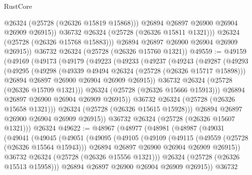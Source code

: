 \begin{lexlean}{RustCore}
\begin{coremodule}
                  @26324
                  (@25728 (@26326 @15819 @15868)))
                @26894
                @26897
                @26900
                @26904
                @26909
                @26915))
            @36732
            @26324
            (@25728 (@26326 @15811 @1321)))
          @26324
          (@25728 (@26326 @15768 @15883)))
        @26894
        @26897
        @26900
        @26904
        @26909
        @26915))
    @36732
    @26324
    (@25728 (@26326 @15760 @1321))
@49559 := @49159
    (@49169
      (@49173
        (@49179
          (@49223
            (@49233
              (@49237
                (@49243
                  (@49287
                    (@49293
                      (@49295
                        (@49298
                          (@49339 @49494 @26324 (@25728 (@26326 @15717 @15898)))
                          @26894
                          @26897
                          @26900
                          @26904
                          @26909
                          @26915))
                      @36732
                      @26324
                      (@25728 (@26326 @15709 @1321)))
                    @26324
                    (@25728 (@26326 @15666 @15913)))
                  @26894
                  @26897
                  @26900
                  @26904
                  @26909
                  @26915))
              @36732
              @26324
              (@25728 (@26326 @15658 @1321)))
            @26324
            (@25728 (@26326 @15615 @15928)))
          @26894
          @26897
          @26900
          @26904
          @26909
          @26915))
      @36732
      @26324
      (@25728 (@26326 @15607 @1321)))
    @26324
@49622 := @48967
    (@48977
      (@48981
        (@48987
          (@49031
            (@49041
              (@49045
                (@49051
                  (@49095
                    (@49105
                      (@49109
                        (@49115
                          (@49559 (@25728 (@26326 @15564 @15943)))
                          @26894
                          @26897
                          @26900
                          @26904
                          @26909
                          @26915))
                      @36732
                      @26324
                      (@25728 (@26326 @15556 @1321)))
                    @26324
                    (@25728 (@26326 @15513 @15958)))
                  @26894
                  @26897
                  @26900
                  @26904
                  @26909
                  @26915))
              @36732

\end{coremodule}
\end{lexlean}
